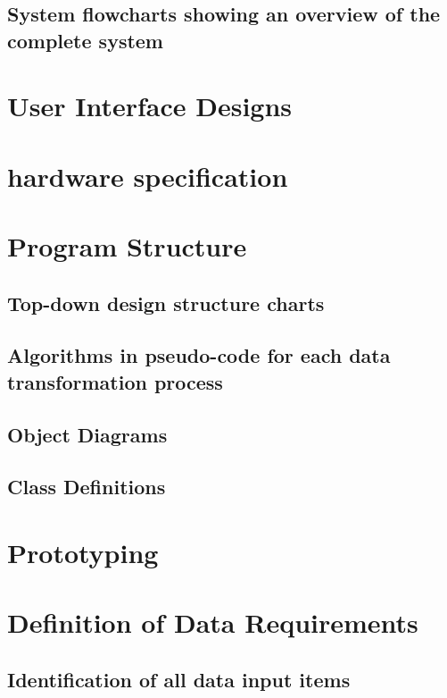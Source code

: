 \subsection{System flowcharts showing an overview of the complete system}

\section{User Interface Designs}

\section{hardware specification}

\section{Program Structure}

\subsection{Top-down design structure charts}

\subsection{Algorithms in pseudo-code for each data transformation process}

\subsection{Object Diagrams}

\subsection{Class Definitions}

\section{Prototyping}

\section{Definition of Data Requirements}

\subsection{Identification of all data input items}

